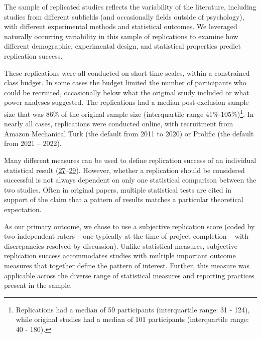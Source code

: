 \documentclass[
  english,
  a4paper,
]{article}
\begin{document}
The sample of replicated studies reflects the variability of the literature, including studies from different subfields (and occasionally fields outside of psychology), with different experimental methods and statistical outcomes. We leveraged naturally occurring variability in this sample of replications to examine how different demographic, experimental design, and statistical properties predict replication success.

These replications were all conducted on short time scales, within a constrained class budget. In some cases the budget limited the number of participants who could be recruited, occasionally below what the original study included or what power analyses suggested. The replications had a median post-exclusion sample size that was 86\% of the original sample size (interquartile range 41\%-105\%)\footnote{Replications had a median of 59 participants (interquartile range: 31 - 124), while original studies had a median of 101 participants (interquartile range: 40 - 180).}. In nearly all cases, replications were conducted online, with recruitment from Amazon Mechanical Turk (the default from 2011 to 2020) or Prolific (the default from 2021 -- 2022).

Many different measures can be used to define replication success of an individual statistical result (\protect\hyperlink{ref-simonsohn2015}{27}--\protect\hyperlink{ref-mathur2020}{29}). However, whether a replication should be considered successful is not always dependent on only one statistical comparison between the two studies. Often in original papers, multiple statistical tests are cited in support of the claim that a pattern of results matches a particular theoretical expectation.

As our primary outcome, we chose to use a subjective replication score (coded by two independent raters -- one typically at the time of project completion -- with discrepancies resolved by discussion). Unlike statistical measures, subjective replication success accommodates studies with multiple important outcome measures that together define the pattern of interest. Further, this measure was applicable across the diverse range of statistical measures and reporting practices present in the sample.
\end{document}
